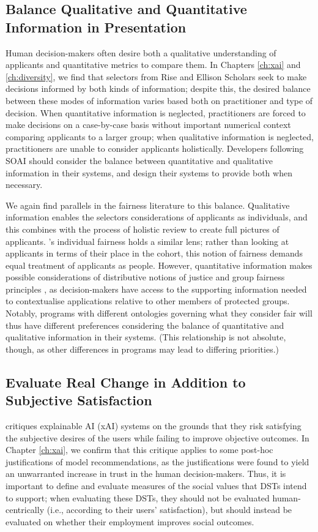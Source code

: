 \subsection{Balance Qualitative and Quantitative Information in Presentation}
Human decision-makers often desire both a qualitative understanding of applicants and quantitative metrics to compare them. In Chapters \ref{ch:xai} and \ref{ch:diversity}, we find that selectors from Rise and Ellison Scholars seek to make decisions informed by both kinds of information; despite this, the desired balance between these modes of information varies based both on practitioner and type of decision. When quantitative information is neglected, practitioners are forced to make decisions on a case-by-case basis without important numerical context comparing applicants to a larger group; when qualitative information is neglected, practitioners are unable to consider applicants holistically. Developers following SOAI should consider the balance between quantitative and qualitative information in their systems, and design their systems to provide both when necessary.

We again find parallels in the fairness literature to this balance. Qualitative information enables the selectors considerations of applicants as individuals, and this combines with the process of holistic review to create full pictures of applicants. \cite{dwork_fairness_2012}'s individual fairness holds a similar lens; rather than looking at applicants in terms of their place in the cohort, this notion of fairness demands equal treatment of applicants as people. However, quantitative information makes possible considerations of distributive notions of justice and group fairness principles \cite{Olsaretti_2018}, as decision-makers have access to the supporting information needed to contextualise applications relative to other members of protected groups. Notably, programs with different ontologies governing what they consider fair will thus have different preferences considering the balance of quantitative and qualitative information in their systems. (This relationship is not absolute, though, as other differences in programs may lead to differing priorities.)

\subsection{Evaluate Real Change in Addition to Subjective Satisfaction}\label{ssec:real_change}
\textcite{Lipton} critiques explainable AI (xAI) systems on the grounds that they risk satisfying the subjective desires of the users while failing to improve objective outcomes. In Chapter \ref{ch:xai}, we confirm that this critique applies to some post-hoc justifications of model recommendations, as the justifications were found to yield an unwarranted increase in trust in the human decision-makers. Thus, it is important to define and evaluate measures of the social values that DSTs intend to support; when evaluating these DSTs, they should not be evaluated human-centrically (i.e., according to their users' satisfaction), but should instead be evaluated on whether their employment improves social outcomes.

